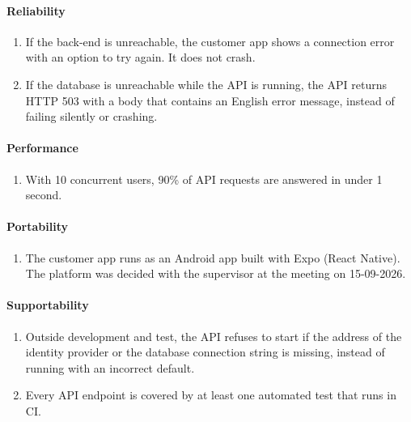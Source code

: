 \documentclass[a4paper,11pt]{article}
\begin{document}
\paragraph{Reliability}
\begin{enumerate}[label=\reqlabel{NFR}, start=3]
    \item If the back-end is unreachable, the customer app shows a connection error with an option to try again. It does not crash.
    \item If the database is unreachable while the API is running, the API returns HTTP 503 with a body that contains an English error message, instead of failing silently or crashing.
\end{enumerate}

\paragraph{Performance}
\begin{enumerate}[label=\reqlabel{NFR}, start=5]
    \item With 10 concurrent users, 90\% of API requests are answered in under 1 second.
\end{enumerate}

\paragraph{Portability}
\begin{enumerate}[label=\reqlabel{NFR}, start=6]
    \item The customer app runs as an Android app built with Expo (React Native). The platform was decided with the supervisor at the meeting on 15-09-2026.
\end{enumerate}

\paragraph{Supportability}
\begin{enumerate}[label=\reqlabel{NFR}, start=7]
    \item Outside development and test, the API refuses to start if the address of the identity provider or the database connection string is missing, instead of running with an incorrect default.
    \item Every API endpoint is covered by at least one automated test that runs in CI.
\end{enumerate}
\end{document}
